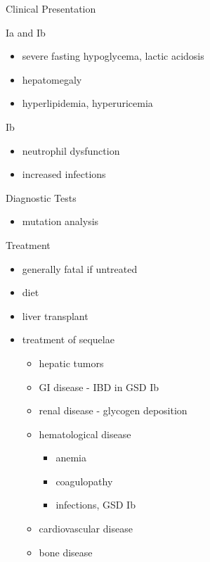 \documentclass[presentation, smaller]{beamer}
\begin{document}
\begin{frame}[label={sec:org4478f7a}]{Clinical Presentation}
\begin{block}{Ia and Ib}
\begin{itemize}
\item severe fasting hypoglycema, lactic acidosis
\item hepatomegaly
\item hyperlipidemia, hyperuricemia
\end{itemize}
\end{block}
\begin{block}{Ib}
\begin{itemize}
\item neutrophil dysfunction
\item increased infections
\end{itemize}
\end{block}
\end{frame}

\begin{frame}[label={sec:orgb28313f}]{Diagnostic Tests}
\begin{itemize}
\item mutation analysis
\end{itemize}
\end{frame}

\begin{frame}[label={sec:orgac8a12f}]{Treatment}
\begin{itemize}
\item generally fatal if untreated
\item diet
\item liver transplant
\item treatment of sequelae
\begin{itemize}
\item hepatic tumors
\item GI disease - IBD in GSD Ib
\item renal disease - glycogen deposition
\item hematological disease
\begin{itemize}
\item anemia
\item coagulopathy
\item infections, GSD Ib
\end{itemize}
\item cardiovascular disease
\item bone disease
\end{itemize}
\end{itemize}
\end{frame}
\end{document}
